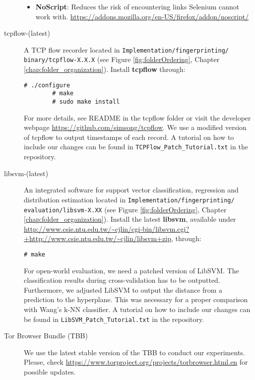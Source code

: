\begin{description}
\begin{itemize}
\item \textbf{NoScript}: Reduces the risk of encountering links Selenium cannot work with. \url{https://addons.mozilla.org/en-US/firefox/addon/noscript/}
\end{itemize}
\item[tcpflow-(latest)] A \ac{TCP} flow recorder located in \texttt{Implementation/fingerprinting/ binary/tcpflow-X.X.X} (see Figure \ref{fig:folderOrdering}, Chapter \ref{chap:folder_organization}). Install \textbf{tcpflow} through: \vspace{-3mm} \begin{verbatim}# ./configure
		# make
		# sudo make install \end{verbatim} \vspace{-3mm} For more details, see README in the tcpflow folder or visit the developer webpage \url{https://github.com/simsong/tcpflow}. We use a modified version of tcpflow to output timestamps of each record. A tutorial on how to include our changes can be found in \texttt{TCPFlow\_Patch\_Tutorial.txt} in the repository.
\item[libsvm-(latest)] An integrated software for support vector classification, regression and distribution estimation located in \texttt{Implementation/fingerprinting/ \\evaluation/libsvm-X.XX} (see Figure \ref{fig:folderOrdering}, Chapter \ref{chap:folder_organization}). Install the latest \textbf{libsvm}, available under \url{http://www.csie.ntu.edu.tw/~cjlin/cgi-bin/libsvm.cgi?+http://www.csie.ntu.edu.tw/~cjlin/libsvm+zip}, through: \vspace{-3mm} \begin{verbatim}# make\end{verbatim} \vspace{-3mm}
For open-world evaluation, we need a patched version of LibSVM. The classification results during cross-validation has to be outputted. Furthermore, we adjusted LibSVM to output the distance from a prediction to the hyperplane. This was necessary for a proper comparison with Wang's k-NN classifier. A tutorial on how to include our changes can be found in \texttt{LibSVM\_Patch\_Tutorial.txt} in the repository.
\item[Tor Browser Bundle (TBB)] We use the latest stable version of the \ac{TBB} to conduct our experiments. Please, check \url{https://www.torproject.org/projects/torbrowser.html.en} for possible updates. %

\end{description}
